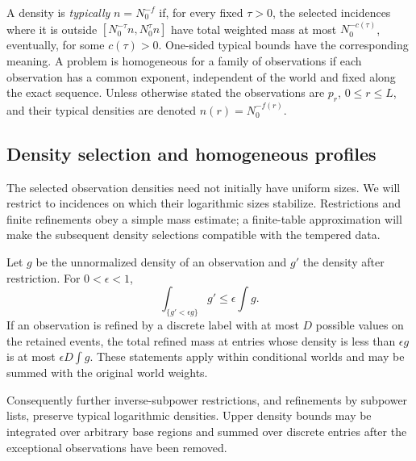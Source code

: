 A density is \emph{typically} \(n=N_0^{-f}\) if, for every fixed
\(\tau>0\), the selected incidences where it is outside
\([N_0^{-\tau}n,N_0^\tau n]\) have total weighted mass at most
\(N_0^{-c(\tau)}\), eventually, for some \(c(\tau)>0\).
One-sided typical bounds have the corresponding meaning.
A problem is homogeneous for a family of observations if each
observation has a common exponent, independent of the world and
fixed along the exact sequence.  Unless otherwise stated the
observations are \(p_r\), \(0\le r\le L\), and their typical densities
are denoted \(n(r)=N_0^{-f(r)}\).

\subsection{Density selection and homogeneous profiles}

The selected observation densities need not initially have uniform
sizes. We will restrict to incidences on which their logarithmic sizes
stabilize. Restrictions and finite refinements obey a simple mass
estimate; a finite-table approximation will make the subsequent density
selections compatible with the tempered data.

\begin{lemma}
\label{a01:density-operations}
Let \(g\) be the unnormalized density of an observation and \(g'\)
the density after restriction.  For \(0<\epsilon<1\),
\begin{equation}
 \int_{\{g'<\epsilon g\}}g'\le
 \epsilon\int g.
 \label{a01:restriction-integral}
\end{equation}
If an observation is refined by a discrete label with at most \(D\)
possible values on the retained events, the total refined mass at
entries whose density is less than \(\epsilon g\) is at most
\(\epsilon D\int g\).
These statements apply within conditional worlds and may be
summed with the original world weights.

Consequently further inverse-subpower restrictions, and refinements
by subpower lists, preserve typical logarithmic densities.
Upper density bounds may be integrated over arbitrary base regions
and summed over discrete entries after the exceptional observations
have been removed.
\end{lemma}

